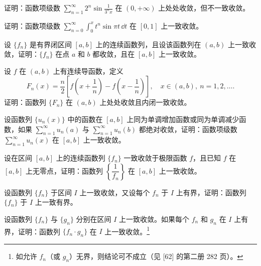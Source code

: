 \begin{xexercise}[5]
证明：函数项级数 $\displaystyle\sum_{n=1}^{\infty}2^n\sin\frac{1}{3^nx}$ 在 $(0,+\infty)$ 上处处收敛，但不一致收敛。
\end{xexercise}

\begin{xexercise}[6]
证明：函数项级数 $\displaystyle\sum_{n=0}^{\infty}\int_0^x t^n\sin\pi t\,\dd t$ 在 $[0,1]$ 上一致收敛。
\end{xexercise}

\begin{xexercise}[7]
设 $\{f_n\}$ 是有界闭区间 $[a,b]$ 上的连续函数列，且设该函数列在 $(a,b)$ 上一致收敛，证明：$\{f_n\}$ 在点 $a$ 和 $b$ 都收敛，且在 $[a,b]$ 上一致收敛。
\end{xexercise}

\begin{xexercise}[8]
设 $f$ 在 $(a,b)$ 上有连续导函数，定义
  \[
    F_n(x)=\frac n2\left[f\left(x+\frac1n\right)-f\left(x-\frac1n\right)\right],\quad x\in(a,b),\ n=1,2,\ldots.
  \]
  证明：函数列 $\{F_n\}$ 在 $(a,b)$ 上处处收敛且内闭一致收敛。
\end{xexercise}

\begin{xexercise}[9]
设函数列 $\{u_n(x)\}$ 中的函数在 $[a,b]$ 上同为单调增加函数或同为单调减少函数，如果 $\displaystyle\sum_{n=1}^{\infty}u_n(a)$ 与 $\displaystyle\sum_{n=1}^{\infty}u_n(b)$ 都绝对收敛，证明：函数项级数 $\displaystyle\sum_{n=1}^{\infty}u_n(x)$ 在 $[a,b]$ 上一致收敛。
\end{xexercise}

\begin{xexercise}[10]
设在区间 $[a,b]$ 上的连续函数列 $\{f_n\}$ 一致收敛于极限函数 $f$，且已知 $f$ 在 $[a,b]$ 上无零点，证明：函数列 $\left\{\dfrac1{f_n}\right\}$ 在 $[a,b]$ 上一致收敛。
\end{xexercise}

\begin{xexercise}[11]
设函数列 $\{f_n\}$ 于区间 $I$ 上一致收敛，又设每个 $f_n$ 于 $I$ 上有界，证明：函数列 $\{f_n\}$ 于 $I$ 上一致有界。
\end{xexercise}

\begin{xexercise}[12]
设函数列 $\{f_n\}$ 与 $\{g_n\}$ 分别在区间 $I$ 上一致收敛。如果每个 $f_n$ 和 $g_n$ 在 $I$ 上有界，证明：函数列 $\{f_n\cdot g_n\}$ 在 $I$ 上一致收敛。\footnote{如允许 $f_n$（或 $g_n$）无界，则结论可不成立（见 [62] 的第二册 282 页）。}
\end{xexercise}


